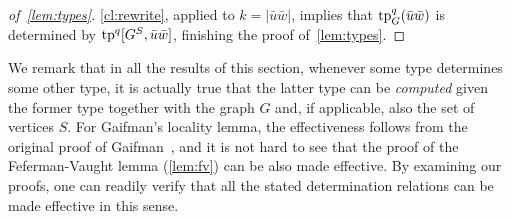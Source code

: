 \begin{proof}[of~\cref{lem:types}]
\begin{comment}
For the inductive step, we consider two cases.
If $\phi$ is a boolean combination of formulas $\phi_1,\ldots,\phi_k$, then 
apply the inductive assumption to each formula $\phi_i$,
yielding formulas $\phi_1',\ldots,\phi_k'$. Then let $\phi'$ be the analogous boolean combination of the formulas $\phi_1',\ldots,\phi_k'$.

Finally, suppose that $\phi$ is of the form $\exists x\, \psi$, where   $Y$ are the free variables of $\phi$ and $x\not \in Y$.
 For $w$ being either the variable $x$ 
or an element $s\in S$, 
let $\psi^w$ be the formula obtained from the inductive assumption applied to the formula $\psi$ 
and pre-valuation $\alpha$ extended to a valuation which maps  $x$ to $w$. 
Then let $\phi'$
be the formula $\exists x\, \psi^x \lor \bigvee_{v\in S}\psi^v$.
The case of $\forall$ is dual.

In each case, it follows from the inductive assumption that $\phi'$ 
satisfies the required condition.
\end{clproof}
\end{comment}

\cref{cl:rewrite}, applied to $k=|\bar u\bar w|$, implies that 
$\mathrm{tp}^q_G(\bar u\bar w)$ is determined by $\mathrm{tp}^q[G^S, \bar u\bar w]$, finishing the proof of~\cref{lem:types}.	
\end{proof}

We remark that in all the results of this section, whenever some type determines some other type, it is actually true that the latter type can be {\em{computed}} given the former type together with the graph $G$ 
and, if applicable, also the set of vertices $S$. For Gaifman's locality lemma, the effectiveness follows from the original proof of Gaifman~\cite{gaifman1982local}, and it is not hard to see that the proof of the Feferman-Vaught lemma (\cref{lem:fv}) can be also made effective. By examining our proofs, one can readily verify that all the stated determination relations can be made effective in this sense.

